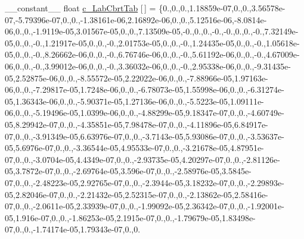 \begin{DoxyCompactItemize}
\item 
\-\_\-\-\_\-constant\-\_\-\-\_\- float \hyperlink{namespacecv_1_1gpu_1_1device_1_1color__detail_a36b89860347b73435993586142450cc9}{c\-\_\-\-Lab\-Cbrt\-Tab} \mbox{[}$\,$\mbox{]} = \{0.,0.,0.,1.\-18859e-\/07,0.,0.,3.\-56578e-\/07,-\/5.\-79396e-\/07,0.,0.,-\/1.\-38161e-\/06,2.\-16892e-\/06,0.,0.,5.\-12516e-\/06,-\/8.\-0814e-\/06,0.,0.,-\/1.\-9119e-\/05,3.\-01567e-\/05,0.,0.,7.\-13509e-\/05,-\/0.,0.,0.,-\/0.,-\/0.,0.,0.,-\/0.,7.\-32149e-\/05,0.,0.,-\/0.,1.\-21917e-\/05,0.,0.,-\/0.,2.\-01753e-\/05,0.,0.,-\/0.,1.\-24435e-\/05,0.,0.,-\/0.,1.\-05618e-\/05,0.,0.,-\/0.,8.\-26662e-\/06,0.,0.,-\/0.,6.\-76746e-\/06,0.,0.,-\/0.,5.\-61192e-\/06,0.,0.,-\/0.,4.\-67009e-\/06,0.,0.,-\/0.,3.\-99012e-\/06,0.,0.,-\/0.,3.\-36032e-\/06,0.,0.,-\/0.,2.\-95338e-\/06,0.,0.,-\/9.\-31435e-\/05,2.\-52875e-\/06,0.,0.,-\/8.\-55572e-\/05,2.\-22022e-\/06,0.,0.,-\/7.\-88966e-\/05,1.\-97163e-\/06,0.,0.,-\/7.\-29817e-\/05,1.\-7248e-\/06,0.,0.,-\/6.\-78073e-\/05,1.\-55998e-\/06,0.,0.,-\/6.\-31274e-\/05,1.\-36343e-\/06,0.,0.,-\/5.\-90371e-\/05,1.\-27136e-\/06,0.,0.,-\/5.\-5223e-\/05,1.\-09111e-\/06,0.,0.,-\/5.\-19496e-\/05,1.\-0399e-\/06,0.,0.,-\/4.\-88299e-\/05,9.\-18347e-\/07,0.,0.,-\/4.\-60749e-\/05,8.\-29942e-\/07,0.,0.,-\/4.\-35851e-\/05,7.\-98478e-\/07,0.,0.,-\/4.\-11896e-\/05,6.\-84917e-\/07,0.,0.,-\/3.\-91349e-\/05,6.\-63976e-\/07,0.,0.,-\/3.\-7143e-\/05,5.\-93086e-\/07,0.,0.,-\/3.\-53637e-\/05,5.\-6976e-\/07,0.,0.,-\/3.\-36544e-\/05,4.\-95533e-\/07,0.,0.,-\/3.\-21678e-\/05,4.\-87951e-\/07,0.,0.,-\/3.\-0704e-\/05,4.\-4349e-\/07,0.,0.,-\/2.\-93735e-\/05,4.\-20297e-\/07,0.,0.,-\/2.\-81126e-\/05,3.\-7872e-\/07,0.,0.,-\/2.\-69764e-\/05,3.\-596e-\/07,0.,0.,-\/2.\-58976e-\/05,3.\-5845e-\/07,0.,0.,-\/2.\-48223e-\/05,2.\-92765e-\/07,0.,0.,-\/2.\-3944e-\/05,3.\-18232e-\/07,0.,0.,-\/2.\-29893e-\/05,2.\-82046e-\/07,0.,0.,-\/2.\-21432e-\/05,2.\-52315e-\/07,0.,0.,-\/2.\-13862e-\/05,2.\-58416e-\/07,0.,0.,-\/2.\-0611e-\/05,2.\-33939e-\/07,0.,0.,-\/1.\-99092e-\/05,2.\-36342e-\/07,0.,0.,-\/1.\-92001e-\/05,1.\-916e-\/07,0.,0.,-\/1.\-86253e-\/05,2.\-1915e-\/07,0.,0.,-\/1.\-79679e-\/05,1.\-83498e-\/07,0.,0.,-\/1.\-74174e-\/05,1.\-79343e-\/07,0.,0.
\end{DoxyCompactItemize}

